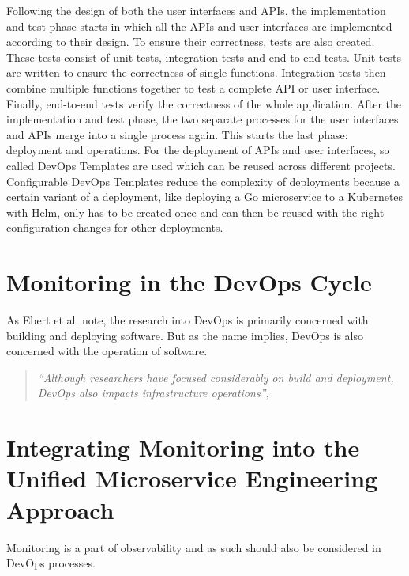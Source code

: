 Following the design of both the user interfaces and APIs,
the implementation and test phase starts in which all the APIs and user interfaces
are implemented according to their design. To ensure their correctness,
tests are also created. These tests consist of unit tests, integration tests and end-to-end tests.
Unit tests are written to ensure the correctness of single functions.
Integration tests then combine multiple functions together to test a complete API or user interface.
Finally, end-to-end tests verify the correctness of the whole application.
After the implementation and test phase, the two separate processes for the user interfaces
and APIs merge into a single process again. This starts the last phase: deployment and operations.
For the deployment of APIs and user interfaces, so called DevOps Templates are used
which can be reused across different projects. Configurable DevOps Templates reduce the complexity
of deployments because a certain variant of a deployment, like deploying a Go microservice
to a Kubernetes with Helm, only has to be created once and can then be reused with
the right configuration changes for other deployments.

\section{Monitoring in the DevOps Cycle}


As Ebert et al. \cite{EG+16} note, the research into DevOps is primarily concerned with
building and deploying software. But as the name implies, DevOps is also concerned with the
operation of software.


\begin{quote}
\textit{``Although researchers have focused considerably on build and deployment,
DevOps also impacts infrastructure operations'', \cite{EG+16}}
\end{quote}

\section{Integrating Monitoring into the Unified Microservice Engineering Approach}


Monitoring is a part of observability and as such should also be considered in DevOps processes.


